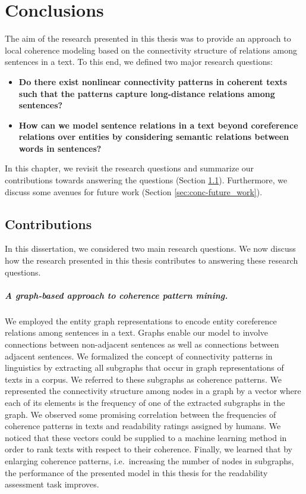 
\chapter{Conclusions} 
\label{ch:conc} 

The aim of the research presented in this thesis was to provide an approach to local coherence modeling based on the connectivity structure of relations among sentences in a text.  
To this end, we defined two major research questions: 
\begin{itemize}
	\item \textbf{Do there exist nonlinear connectivity patterns in coherent texts such that the patterns capture \mbox{long-distance} relations among sentences?} 

	\item \textbf{How can we model sentence relations in a text beyond coreference relations over entities by considering semantic relations between words in sentences?} 
\end{itemize}

In this chapter, we revisit the research questions and summarize our contributions towards answering the questions (Section \ref{sec:conc-contributions}). 
Furthermore, we discuss some avenues for future work (Section \ref{sec:conc-future_work}).

\section{Contributions}
\label{sec:conc-contributions}

In this dissertation, we considered two main research questions. 
We now discuss how the research presented in this thesis contributes to answering these research questions.

\paragraph{A graph-based approach to coherence pattern mining.} 
We employed the entity graph representations to encode entity coreference relations among sentences in a text. 
Graphs enable our model to involve connections between non-adjacent sentences as well as connections between adjacent sentences. 
We formalized the concept of connectivity patterns in linguistics \cite{danes74a,stoddard91} by extracting all subgraphs that occur in graph representations of texts in a corpus. 
We referred to these subgraphs as coherence patterns. 
We represented the connectivity structure among nodes in a graph by a vector where each of its elements is the frequency of one of the extracted subgraphs in the graph. 
We observed some promising correlation between the frequencies of coherence patterns in texts and readability ratings assigned by humans. 
We noticed that these vectors could be supplied to a machine learning method in order to rank texts with respect to their coherence. 
Finally, we learned that by enlarging coherence patterns, i.e.\ increasing the number of nodes in subgraphs, the performance of the presented model in this thesis for the readability assessment task improves. 

